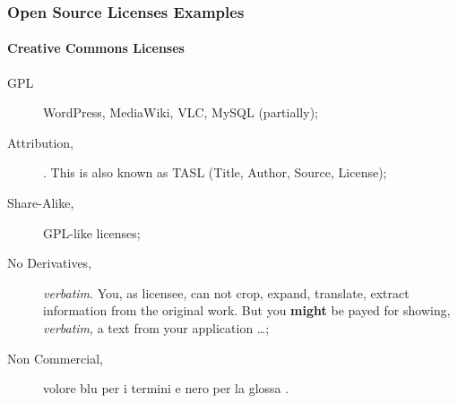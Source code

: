 \begin{frame}
    \frametitle{Open Source Licenses Examples}
    \framesubtitle{Creative Commons \ccLogo Licenses}
    \addtocounter{nframe}{1}

    \begin{description}
    \item [GPL] WordPress, MediaWiki, VLC, MySQL (partially);
    \item[Attribution, \ccAttribution] \cite{CCwikiBY2014}. This is also known as TASL (Title, Author, Source, License);
    \item[Share-Alike, \ccShareAlike] GPL-like licenses;
    \item[No Derivatives, \ccNoDerivatives]  \textit{verbatim}. You, as licensee, can not crop, expand, translate, extract information from the original work. But you \textbf{might} be payed for showing, \textit{verbatim}, a text from your application \ldots;
    \item[Non Commercial, \ccNonCommercial] volore blu per i termini e nero per la glossa .

    \end{description}
    
\end{frame}

